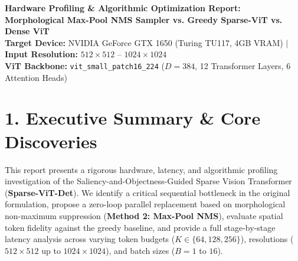 \documentclass[11pt,a4paper]{article}
\begin{document}
\begin{tcolorbox}[colback=lightbg,colframe=primary,arc=3mm,boxrule=1.2pt]
    \centering
    {\LARGE \textbf{\color{primary}Hardware Profiling \& Algorithmic Optimization Report:}}\\[0.2em]
    {\Large \textbf{Morphological Max-Pool NMS Sampler vs. Greedy Sparse-ViT vs. Dense ViT}}\\[0.4em]
    \textbf{Target Device:} NVIDIA GeForce GTX 1650 (Turing TU117, 4GB VRAM) \quad $\vert$ \quad \textbf{Input Resolution:} $512\times 512$ -- $1024\times 1024$\\[0.2em]
    \textbf{ViT Backbone:} \texttt{vit\_small\_patch16\_224} ($D=384$, 12 Transformer Layers, 6 Attention Heads)
\end{tcolorbox}

\vspace{0.6em}

\section*{1. Executive Summary \& Core Discoveries}

This report presents a rigorous hardware, latency, and algorithmic profiling investigation of the Saliency-and-Objectness-Guided Sparse Vision Transformer (\textbf{Sparse-ViT-Det}). We identify a critical sequential bottleneck in the original formulation, propose a zero-loop parallel replacement based on morphological non-maximum suppression (\textbf{Method 2: Max-Pool NMS}), evaluate spatial token fidelity against the greedy baseline, and provide a full stage-by-stage latency analysis across varying token budgets ($K \in \{64, 128, 256\}$), resolutions ($512\times 512$ up to $1024\times 1024$), and batch sizes ($B=1$ to $16$).
\end{document}
